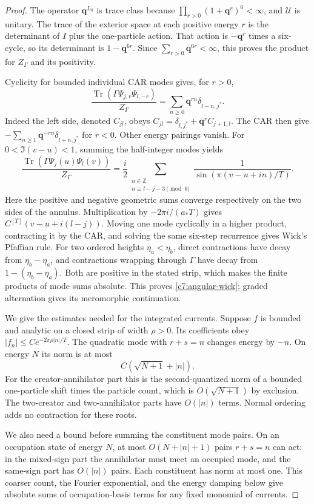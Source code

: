 \begin{proof}
The operator $\mathbf q^{L_0}$ is trace class because
$\prod_{r>0}(1+\mathbf q^r)^6<\infty$, and $\mathcal U$ is unitary. The trace of the exterior space at each positive energy $r$ is the determinant of $I$ plus the one-particle action. That action is $-\mathbf q^r$ times a six-cycle, so its determinant is $1-\mathbf q^{6r}$. Since $\sum_{r>0}\mathbf q^{6r}<\infty$, this proves the product for $Z_\Gamma$ and its positivity.

Cyclicity for bounded individual CAR modes gives, for $r>0$,
\[
\frac{\operatorname{Tr}(\Gamma\Psi_{j,r}\Psi_{l,-r})}{Z_\Gamma}
=\sum_{n\ge0}\mathbf q^{rn}\delta_{l-n,j^*}.
\]
Indeed the left side, denoted $C_{jl}$, obeys
$C_{jl}=\delta_{l,j^*}+\mathbf q^r C_{j+1,l}$.
The CAR then give
$-\sum_{n\ge1}\mathbf q^{-rn}\delta_{l+n,j^*}$ for $r<0$.
Other energy pairings vanish. For $0<\Im(v-u)<1$, summing the half-integer modes yields
\[
\frac{\operatorname{Tr}(\Gamma\Psi_j(u)\Psi_l(v))}{Z_\Gamma}
=\frac{i}{2}
 \sum_{\substack{n\in\mathbb Z\\n\equiv l-j-3\pmod6}}
 \frac1{\sin(\pi(v-u+in)/T)}.
\]
Here the positive and negative geometric sums converge respectively on the two sides of the annulus. Multiplication by $-2\pi i/(a_*T)$ gives
$C^{[T]}(v-u+i(l-j))$. Moving one mode cyclically in a higher product, contracting it by the CAR, and solving the same six-step recurrence gives Wick's Pfaffian rule. For two ordered heights $\eta_a<\eta_b$, direct contractions have decay from $\eta_b-\eta_a$, and contractions wrapping through $\Gamma$ have decay from $1-(\eta_b-\eta_a)$. Both are positive in the stated strip, which makes the finite products of mode sums absolute. This proves \eqref{c7:angular-wick}; graded alternation gives its meromorphic continuation.

We give the estimates needed for the integrated currents. Suppose $f$ is bounded and analytic on a closed strip of width $\rho>0$. Its coefficients obey
$|f_n|\le C e^{-2\pi\rho|n|/T}$. The quadratic mode with $r+s=n$ changes energy by $-n$. On energy $N$ its norm is at most
\[
C(\sqrt{N+1}+|n|).
\]
For the creator-annihilator part this is the second-quantized norm of a bounded one-particle shift times the particle count, which is $O(\sqrt{N+1})$ by exclusion. The two-creator and two-annihilator parts have $O(|n|)$ terms. Normal ordering adds no contraction for these roots.

We also need a bound before summing the constituent mode pairs. On an occupation state of energy $N$, at most $O(N+|n|+1)$ pairs $r+s=n$ can act: in the mixed-sign part the annihilator must meet an occupied mode, and the same-sign part has $O(|n|)$ pairs. Each constituent has norm at most one. This coarser count, the Fourier exponential, and the energy damping below give absolute sums of occupation-basis terms for any fixed monomial of currents.


\end{proof}
